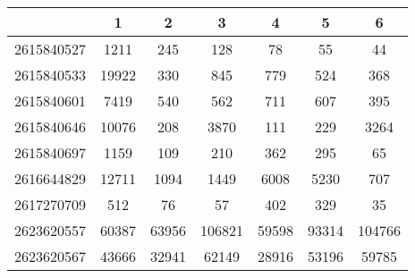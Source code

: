 \begin{adjustbox}{center}
\begin{tabular}{|l||c|c|c|c|c|c|}
\hline
& 1 & 2 & 3 & 4 & 5 & 6 \\
\hline
\hline
2615840527 & \cellcolor[RGB]{235, 71, 71} 1211 & \cellcolor[RGB]{235, 71, 71} 245 & \cellcolor[RGB]{253, 237, 237} 128 & \cellcolor[RGB]{241, 241, 253} 78 & \cellcolor[RGB]{227, 227, 252} 55 & \cellcolor[RGB]{223, 223, 251} 44 \\
\hline
2615840533 & \cellcolor[RGB]{235, 71, 71} 19922 & \cellcolor[RGB]{223, 223, 251} 330 & \cellcolor[RGB]{252, 232, 232} 845 & \cellcolor[RGB]{253, 241, 241} 779 & \cellcolor[RGB]{241, 241, 253} 524 & \cellcolor[RGB]{227, 227, 252} 368 \\
\hline
2615840601 & \cellcolor[RGB]{235, 71, 71} 7419 & \cellcolor[RGB]{227, 227, 252} 540 & \cellcolor[RGB]{241, 241, 253} 562 & \cellcolor[RGB]{235, 71, 71} 711 & \cellcolor[RGB]{253, 237, 237} 607 & \cellcolor[RGB]{94, 94, 237} 395 \\
\hline
2615840646 & \cellcolor[RGB]{235, 71, 71} 10076 & \cellcolor[RGB]{232, 232, 252} 208 & \cellcolor[RGB]{251, 223, 223} 3870 & \cellcolor[RGB]{232, 232, 252} 111 & \cellcolor[RGB]{232, 232, 252} 229 & \cellcolor[RGB]{252, 232, 232} 3264 \\
\hline
2615840697 & \cellcolor[RGB]{235, 71, 71} 1159 & \cellcolor[RGB]{223, 223, 251} 109 & \cellcolor[RGB]{246, 246, 254} 210 & \cellcolor[RGB]{251, 223, 223} 362 & \cellcolor[RGB]{253, 241, 241} 295 & \cellcolor[RGB]{214, 214, 250} 65 \\
\hline
2616644829 & \cellcolor[RGB]{235, 71, 71} 12711 & \cellcolor[RGB]{232, 232, 252} 1094 & \cellcolor[RGB]{237, 237, 253} 1449 & \cellcolor[RGB]{251, 223, 223} 6008 & \cellcolor[RGB]{252, 232, 232} 5230 & \cellcolor[RGB]{227, 227, 252} 707 \\
\hline
2617270709 & \cellcolor[RGB]{249, 200, 200} 512 & \cellcolor[RGB]{232, 232, 252} 76 & \cellcolor[RGB]{232, 232, 252} 57 & \cellcolor[RGB]{251, 223, 223} 402 & \cellcolor[RGB]{252, 232, 232} 329 & \cellcolor[RGB]{227, 227, 252} 35 \\
\hline
2623620557 & \cellcolor[RGB]{232, 232, 252} 60387 & \cellcolor[RGB]{237, 237, 253} 63956 & \cellcolor[RGB]{250, 214, 214} 106821 & \cellcolor[RGB]{227, 227, 252} 59598 & \cellcolor[RGB]{252, 232, 232} 93314 & \cellcolor[RGB]{251, 218, 218} 104766 \\
\hline
2623620567 & \cellcolor[RGB]{246, 246, 254} 43666 & \cellcolor[RGB]{223, 223, 251} 32941 & \cellcolor[RGB]{251, 218, 218} 62149 & \cellcolor[RGB]{214, 214, 250} 28916 & \cellcolor[RGB]{253, 241, 241} 53196 & \cellcolor[RGB]{252, 227, 227} 59785 \\

\end{tabular}
\end{adjustbox}

